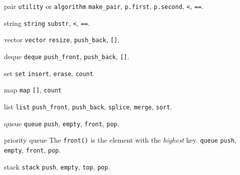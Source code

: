 \categorycontents{}
\newpage

\begin{algorithm}{pair}
{\tt utility} or {\tt algorithm}
\usage{}
{\tt make\_pair}, {\tt p.first}, {\tt p.second}, {\tt <}, {\tt ==}.
\end{algorithm}

\begin{algorithm}{string}
{\tt string}
\usage{}
{\tt substr}, {\tt <}, {\tt ==}.
\end{algorithm}

\begin{algorithm}{vector}
{\tt vector}
\usage{}
{\tt resize}, {\tt push\_back}, {\tt []}.
\end{algorithm}

\begin{algorithm}{deque}
{\tt deque}
\usage{}
{\tt push\_front}, {\tt push\_back}, {\tt []}.
\end{algorithm}

\begin{algorithm}{set}
{\tt set}
\usage{}
{\tt insert}, {\tt erase}, {\tt count}
\end{algorithm}

\begin{algorithm}{map}
{\tt map}
\usage{}
{\tt []}, {\tt count}
\end{algorithm}

\begin{algorithm}{list}
{\tt list}
\usage{}
{\tt push\_front}, {\tt push\_back}, {\tt splice}, {\tt merge}, {\tt sort}.
\end{algorithm}

\begin{algorithm}{queue}
{\tt queue}
\usage{}
{\tt push}, {\tt empty}, {\tt front}, {\tt pop}.
\end{algorithm}

\begin{algorithm}{priority queue}
The {\tt front()} is the element with the {\em highest} key.
{\tt queue}
\usage{}
{\tt push}, {\tt empty}, {\tt front}, {\tt pop}.
\end{algorithm}

\begin{algorithm}{stack}
{\tt stack}
\usage{}
{\tt push}, {\tt empty}, {\tt top}, {\tt pop}.
\end{algorithm}

